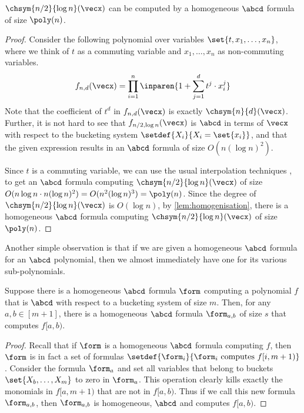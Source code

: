 \begin{observation}\label{obs:UBonCHSYMlogDeg}
	$\chsym{n/2}{\log n}(\vecx)$ can be computed by a homogeneous $\abcd$ formula of size $\poly(n)$.
\end{observation}

\begin{proof}
	Consider the following polynomial over variables $\set{t, x_1, \ldots, x_n}$, where we think of $t$ as a commuting variable and $x_1, \ldots, x_n$ as non-commuting variables. 
	\[
		f_{n, d}(\vecx) = \prod_{i=1}^{n} \inparen{1 + \sum_{j=1}^{d} t^j \cdot x_i^j}
	\]
	Note that the coefficient of $t^d$ in $f_{n, d}(\vecx)$ is exactly $\chsym{n}{d}(\vecx)$.
	Further, it is not hard to see that $f_{n/2, \log n}(\vecx)$ is $\abcd$ in terms of $\vecx$ with respect to the bucketing system $\setdef{X_i}{X_i = \set{x_i}}$, and that the given expression results in an $\abcd$ formula of size $O(n (\log n)^2)$. 
	
	Since $t$ is a commuting variable, we can use the usual interpolation techniques \cite{BC92}, to get an $\abcd$ formula computing $\chsym{n/2}{\log n}(\vecx)$ of size $O(n \log n \cdot n (\log n)^2) = O(n^2 (\log n)^3) = \poly(n)$. 
	Since the degree of $\chsym{n/2}{\log n}(\vecx)$ is $O(\log n)$, by \autoref{lem:homogenisation}, there is a homogeneous $\abcd$ formula computing $\chsym{n/2}{\log n}(\vecx)$ of size $\poly(n)$.
\end{proof}

\noindent Another simple observation is that if we are given a homogeneous $\abcd$ formula for an $\abcd$ polynomial, then we almost immediately have one for its various sub-polynomials.

\begin{observation}\label{obs:subformula}
	Suppose there is a homogeneous $\abcd$ formula $\form$ computing a polynomial $f$ that is $\abcd$ with respect to a bucketing system of size $m$. 
	Then, for any $a, b \in [m+1]$, there is a homogeneous $\abcd$ formula $\form_{a,b}$ of size $s$ that computes $f[a,b)$.
\end{observation}

\begin{proof}
	Recall that if $\form$ is a homogeneous $\abcd$ formula computing $f$, then $\form$ is in fact a set of formulas $\setdef{\form_i}{\form_i \text{ computes } f[i,m+1)}$. 
	Consider the formula $\form_a$ and set all variables that belong to buckets $\set{X_b, \ldots, X_m}$ to zero in $\form_a$. 
	This operation clearly kills exactly the monomials in $f[a,m+1)$ that are not in $f[a,b)$.
	Thus if we call this new formula $\form_{a,b}$, then $\form_{a,b}$ is homogeneous, $\abcd$ and computes $f[a,b)$.
\end{proof}

